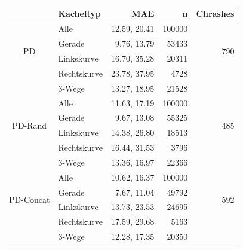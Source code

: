 \begin{tabular}[t]{|c|l|r|r|r|}
	\hline
	 & \textbf{Kacheltyp} & \textbf{MAE} & \textbf{n} & Chrashes \\
	\hline
	\multirow{4}{*}{PD} 
	& Alle
	& 12.59, 20.41
	& 100000
	& \multirow{4}{*}{790}\\
	\cline{2-4}
	& Gerade
	&  9.76, 13.79
	& 53433
	&\\
	\cline{2-4}
	& Linkskurve
	& 16.70,  35.28
	& 20311
	&\\
	\cline{2-4}
	& Rechtskurve
	& 23.78, 37.95 
	& 4728
	&\\
	\cline{2-4}
	& 3-Wege
	&  13.27, 18.95
	& 21528
	&\\
	\hline
	\multirow{4}{*}{PD-Rand} 
	& Alle
	& 11.63, 17.19
	& 100000
	& \multirow{4}{*}{485}\\
	\cline{2-4}
	& Gerade
	&  9.67, 13.08
	& 55325 & \\
	\cline{2-4}
	& Linkskurve
	& 14.38, 26.80
	& 18513
	&\\
	\cline{2-4}
	& Rechtskurve
	& 16.44, 31.53
	& 3796
	&\\
	\cline{2-4}
	& 3-Wege
	& 13.36, 16.97
	& 22366
	&\\
	\hline
	\multirow{4}{*}{PD-Concat} 
	& Alle
	& 10.62, 16.37
	& 100000
	& \multirow{4}{*}{592}\\
	\cline{2-4}
	& Gerade
	& 7.67, 11.04
	& 49792
	&\\
	\cline{2-4}
	& Linkskurve
	& 13.73, 23.53
	& 24695
	&\\
	\cline{2-4}
	& Rechtskurve
	& 17.59, 29.68
	& 5163
	&\\
	\cline{2-4}
	& 3-Wege
	& 12.28, 17.35
	& 20350
	&\\
	\hline
\end{tabular}



